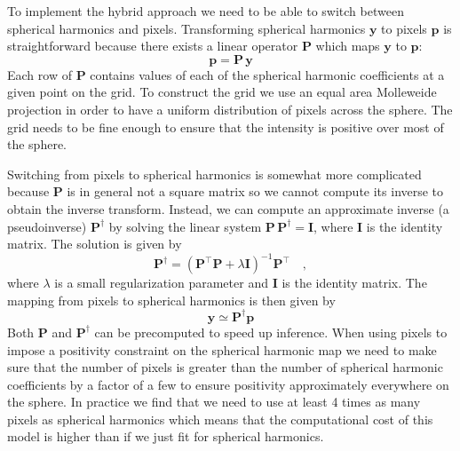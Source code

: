 \documentclass[modern]{aastex62}
\begin{document}
To implement the hybrid approach we need to be able to switch between spherical harmonics and pixels.
Transforming spherical harmonics $\mathbf{y}$ to pixels $\mathbf{p}$ is straightforward because there exists a linear operator $\mathbf{P}$ which maps $\mathbf{y}$ to $\mathbf{p}$:
\begin{equation}
    \mathbf{p}=\mathbf{P}\,\mathbf{y}
    \label{eq:ylms_to_pixels}
\end{equation}
Each row of $\mathbf{P}$ contains values of each of the spherical harmonic coefficients at a given point on the grid. 
To construct the grid we use an equal area Molleweide projection in order to have a uniform distribution of pixels across the sphere.
The grid needs to be fine enough to ensure that the intensity is positive over most of the sphere.

Switching from pixels to spherical harmonics is somewhat more complicated because $\mathbf{P}$ is in general not a square matrix so we cannot compute its inverse to obtain the inverse transform.
Instead, we can compute an approximate inverse (a pseudoinverse) $\mathbf{P}^\dagger$ by solving the linear system $\mathbf{P}\,\mathbf{P}^\dagger=\mathbf{I}$, where $\mathbf{I}$ is the identity matrix. 
The solution is given by
\begin{equation}
\mathbf{P}^\dagger=\left(\mathbf{P}^{\top} \mathbf{P}+\lambda \mathbf{I}\right)^{-1} \mathbf{P}^{\top}
    \quad,
\end{equation}
where $\lambda$ is a small regularization parameter and $\mathbf{I}$ is the identity matrix.
The mapping from pixels to spherical harmonics is then given by
\begin{equation}
    \mathbf{y}\simeq\mathbf{P}^\dagger\mathbf{p}
    \label{eq:pixels_to_ylms}
\end{equation}
Both $\mathbf{P}$ and $\mathbf{P}^\dagger$ can be precomputed to speed up inference.
When using pixels to impose a positivity constraint on the spherical harmonic map we need to make sure that the number of pixels is greater than the number of spherical harmonic coefficients by a factor of a few to ensure positivity approximately everywhere on the sphere.
In practice we find that we need to use at least 4 times as many pixels as spherical harmonics which means that the computational cost of this model is higher than if we just fit for spherical harmonics. 
\end{document}
